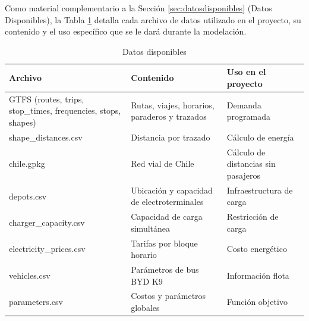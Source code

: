 Como material complementario a la Secci\'on \ref{sec:datosdisponibles} (Datos Disponibles), la Tabla \ref{tab:datosdisponibles} detalla cada archivo de datos utilizado en el proyecto, su contenido y el uso espec\'ifico que se le dar\'a durante la modelaci\'on.

\begin{table}[H]
\begin{center}
\small
\caption[Datos disponibles]{Datos disponibles}
\label{tab:datosdisponibles}
\begin{tabular}{@{}p{} p{} p{}@{}}\toprule
\textbf{Archivo} & \textbf{Contenido} & \textbf{Uso en el proyecto} \\ \midrule
GTFS (routes, trips, stop\_times, frequencies, stops, shapes) & Rutas, viajes, horarios, paraderos y trazados & Demanda programada \\
shape\_distances.csv & Distancia por trazado & C\'alculo de energ\'ia \\
chile.gpkg & Red vial de Chile & C\'alculo de distancias sin pasajeros \\
depots.csv & Ubicaci\'on y capacidad de electroterminales & Infraestructura de carga \\
charger\_capacity.csv & Capacidad de carga simult\'anea & Restricci\'on de carga \\
electricity\_prices.csv & Tarifas por bloque horario & Costo energ\'etico \\
vehicles.csv & Par\'ametros de bus BYD K9 & Informaci\'on flota \\
parameters.csv & Costos y par\'ametros globales & Funci\'on objetivo \\
\bottomrule
\end{tabular}
\end{center}
\end{table}
